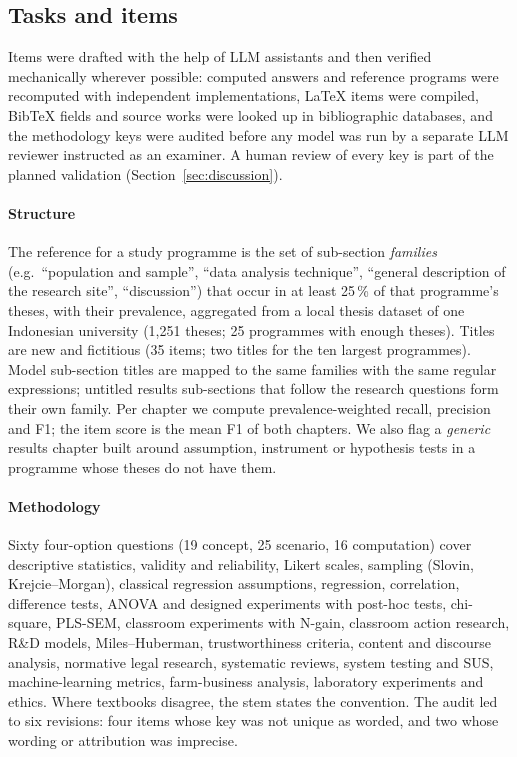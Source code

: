 \subsection{Tasks and items}
Items were drafted with the help of LLM assistants and then verified mechanically wherever possible: computed answers and reference programs were recomputed with independent implementations, LaTeX items were compiled, BibTeX fields and source works were looked up in bibliographic databases, and the methodology keys were audited before any model was run by a separate LLM reviewer instructed as an examiner. A human review of every key is part of the planned validation (Section~\ref{sec:discussion}).

\paragraph{Structure} The reference for a study programme is the set of sub-section \emph{families} (e.g.\ ``population and sample'', ``data analysis technique'', ``general description of the research site'', ``discussion'') that occur in at least 25\,\% of that programme's theses, with their prevalence, aggregated from a local thesis dataset of one Indonesian university (1{,}251 theses; 25 programmes with enough theses). Titles are new and fictitious (35 items; two titles for the ten largest programmes). Model sub-section titles are mapped to the same families with the same regular expressions; untitled results sub-sections that follow the research questions form their own family. Per chapter we compute prevalence-weighted recall, precision and F1; the item score is the mean F1 of both chapters. We also flag a \emph{generic} results chapter built around assumption, instrument or hypothesis tests in a programme whose theses do not have them.

\paragraph{Methodology} Sixty four-option questions (19 concept, 25 scenario, 16 computation) cover descriptive statistics, validity and reliability, Likert scales, sampling (Slovin, Krejcie--Morgan), classical regression assumptions, regression, correlation, difference tests, ANOVA and designed experiments with post-hoc tests, chi-square, PLS-SEM, classroom experiments with N-gain, classroom action research, R\&D models, Miles--Huberman, trustworthiness criteria, content and discourse analysis, normative legal research, systematic reviews, system testing and SUS, machine-learning metrics, farm-business analysis, laboratory experiments and ethics. Where textbooks disagree, the stem states the convention. The audit led to six revisions: four items whose key was not unique as worded, and two whose wording or attribution was imprecise.

